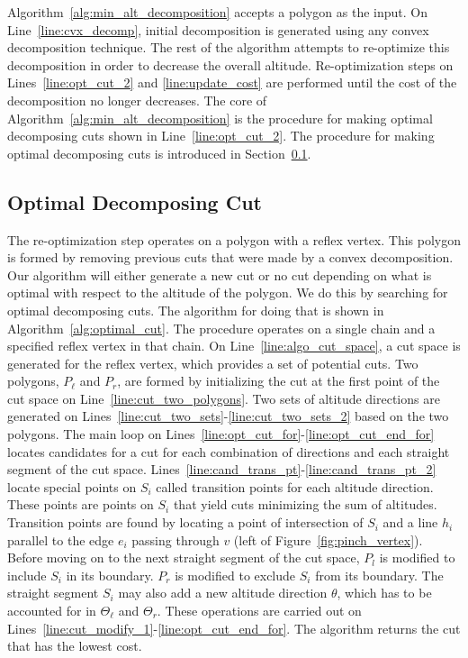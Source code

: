 \documentclass[../main.tex]{subfiles}
\begin{document}
Algorithm~\ref{alg:min_alt_decomposition} accepts a polygon as the input. On Line~\ref{line:cvx_decomp}, initial decomposition is generated using any convex decomposition technique. The rest of the algorithm attempts to re-optimize this decomposition in order to decrease the overall altitude. Re-optimization steps on Lines~\ref{line:opt_cut_2} and \ref{line:update_cost} are performed until the cost of the decomposition no longer decreases. The core of Algorithm~\ref{alg:min_alt_decomposition} is the procedure for making optimal decomposing cuts shown in Line~\ref{line:opt_cut_2}. The procedure for making optimal decomposing cuts is introduced in Section~\ref{sec:alt_cut_decomposition}.

\subsection{Optimal Decomposing Cut}
\label{sec:alt_cut_decomposition}
The re-optimization step operates on a polygon with a reflex vertex. This polygon is formed by removing previous cuts that were made by a convex decomposition. Our algorithm will either generate a new cut or no cut depending on what is optimal with respect to the altitude of the polygon. We do this by searching for optimal decomposing cuts. The algorithm for doing that is shown in Algorithm~\ref{alg:optimal_cut}. The procedure operates on a single chain and a specified reflex vertex in that chain. On Line~\ref{line:algo_cut_space}, a cut space is generated for the reflex vertex, which provides a set of potential cuts. Two polygons, $P_{\ell}$ and $P_r$, are formed by initializing the cut at the first point of the cut space on Line~\ref{line:cut_two_polygons}. Two sets of altitude directions are generated on Lines~\ref{line:cut_two_sets}-\ref{line:cut_two_sets_2} based on the two polygons. The main loop on Lines~\ref{line:opt_cut_for}-\ref{line:opt_cut_end_for} locates candidates for a cut for each combination of directions and each straight segment of the cut space. Lines~\ref{line:cand_trans_pt}-\ref{line:cand_trans_pt_2} locate special points on $S_i$ called transition points for each altitude direction. These points are points on $S_i$ that yield cuts minimizing the sum of altitudes. Transition points are found by locating a point of intersection of $S_i$ and a line $h_i$ parallel to the edge $e_i$ passing through $v$ (left of Figure~\ref{fig:pinch_vertex}). Before moving on to the next straight segment of the cut space, $P_l$ is modified to include $S_i$ in its boundary. $P_r$ is modified to exclude $S_i$ from its boundary. The straight segment $S_i$ may also add a new altitude direction $\theta$, which has to be accounted for in $\Theta_{\ell}$ and $\Theta_r$. These operations are carried out on Lines~\ref{line:cut_modify_1}-\ref{line:opt_cut_end_for}. The algorithm returns the cut that has the lowest cost.
\end{document}
